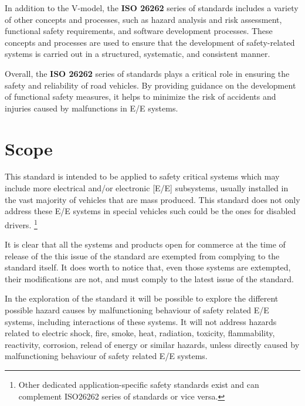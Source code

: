 \documentclass[./dissertation.tex]{subfiles}
\begin{document}

In addition to the V-model, the \textbf{ISO 26262} series of standards includes a variety of other concepts and processes, such as hazard analysis and risk assessment, functional safety requirements, and software development processes. These concepts and processes are used to ensure that the development of safety-related systems is carried out in a structured, systematic, and consistent manner.

Overall, the \textbf{ISO 26262} series of standards plays a critical role in ensuring the safety and reliability of road vehicles. By providing guidance on the development of functional safety measures, it helps to minimize the risk of accidents and injuries caused by malfunctions in E/E systems.

\section{Scope}
This standard is intended to be applied to safety critical systems which may include more electrical and/or electronic [E/E] subsystems, usually installed in the vast majority of vehicles that are mass produced. This standard does not only address these E/E systems in special vehicles such could be the ones for disabled drivers. \footnote{ Other dedicated application-specific safety standards exist and can complement ISO26262 series of standards or vice versa.}

It is clear that all the systems and products open for commerce at the time of release of the this issue of the standard are exempted from complying to the standard itself. It does worth to notice that, even those systems are extempted, their modifications are not, and must comply to the latest issue of the standard.

In the exploration of the standard it will be possible to explore the different possible hazard causes by malfunctioning behaviour of safety related E/E systems, including interactions of these systems. It will not address hazards related to electric shock, fire, smoke, heat, radiation, toxicity, flammability, reactivity, corrosion, relead of energy or similar hazards, unless directly caused by malfunctioning behaviour of safety related E/E systems.
\end{document}
